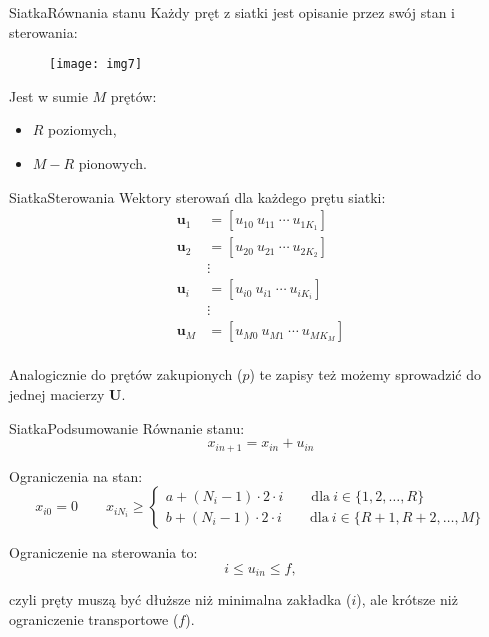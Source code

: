 \documentclass[11pt]{beamer}
\begin{document}
\begin{frame}{Siatka}{Równania stanu}
Każdy pręt z siatki jest opisanie przez swój stan i sterowania:
\begin{figure}[h!]
	\centering
	\texttt{[image: img7]}
\end{figure}

\pause

Jest w sumie $M$ prętów:
\begin{itemize}
\item $R$ poziomych,
\item $M - R$ pionowych.
\end{itemize}
\end{frame}

\begin{frame}{Siatka}{Sterowania}
Wektory sterowań dla każdego prętu siatki:
\begin{align*}
\mathbf{u}_1 &= \left[ u_{10} \ u_{11} \ \cdots \ u_{1K_1} \right] \\
\mathbf{u}_2 &= \left[ u_{20} \ u_{21} \ \cdots \ u_{2K_2} \right] \\
& \vdots \\
\mathbf{u}_i &= \left[ u_{i0} \ u_{i1} \ \cdots \ u_{iK_i} \right] \\
& \vdots \\
\mathbf{u}_M &= \left[ u_{M0} \ u_{M1} \ \cdots \ u_{MK_M} \right] \\
\end{align*}

\pause

Analogicznie do prętów zakupionych ($p$) te zapisy też możemy sprowadzić do jednej macierzy $\mathbf{U}$.
\end{frame}

\begin{frame}{Siatka}{Podsumowanie}
Równanie stanu:
\begin{equation*}
x_{in+1} = x_{in} + u_{in}
\end{equation*}

\pause

Ograniczenia na stan:
\begin{equation*}
x_{i0} = 0 \qquad
x_{iN_i} \ge
	\begin{cases}
	a + (N_i - 1) \cdot 2 \cdot i \qquad \text{dla} \ i \in \{1, 2, \ldots, R\} \\
	b + (N_i - 1) \cdot 2 \cdot i \qquad \text{dla} \ i \in \{R+1, R+2, \ldots, M\}
	\end{cases}
\end{equation*}

\pause

Ograniczenie na sterowania to:
\begin{equation*}
i \le u_{in} \le f,
\end{equation*}

czyli pręty muszą być dłuższe niż minimalna zakładka ($i$), ale krótsze niż ograniczenie transportowe ($f$).

\end{frame}
\end{document}
